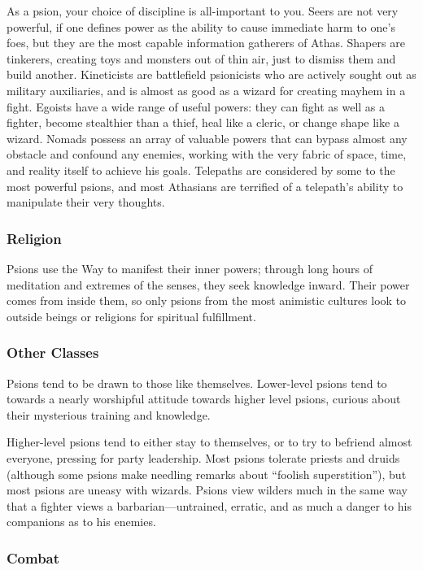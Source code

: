 As a psion, your choice of discipline is all-important to you. Seers are not very powerful, if one defines power as the ability to cause immediate harm to one's foes, but they are the most capable information gatherers of Athas. Shapers are tinkerers, creating toys and monsters out of thin air, just to dismiss them and build another. Kineticists are battlefield psionicists who are actively sought out as military auxiliaries, and is almost as good as a wizard for creating mayhem in a fight. Egoists have a wide range of useful powers: they can fight as well as a fighter, become stealthier than a thief, heal like a cleric, or change shape like a wizard. Nomads possess an array of valuable powers that can bypass almost any obstacle and confound any enemies, working with the very fabric of space, time, and reality itself to achieve his goals. Telepaths are considered by some to the most powerful psions, and most Athasians are terrified of a telepath's ability to manipulate their very thoughts.

\subsubsection{Religion}
Psions use the Way to manifest their inner powers; through long hours of meditation and extremes of the senses, they seek knowledge inward. Their power comes from inside them, so only psions from the most animistic cultures look to outside beings or religions for spiritual fulfillment.

\subsubsection{Other Classes}
Psions tend to be drawn to those like themselves. Lower-level psions tend to towards a nearly worshipful attitude towards higher level psions, curious about their mysterious training and knowledge.

Higher-level psions tend to either stay to themselves, or to try to befriend almost everyone, pressing for party leadership. Most psions tolerate priests and druids (although some psions make needling remarks about ``foolish superstition''), but most psions are uneasy with wizards. Psions view wilders much in the same way that a fighter views a barbarian---untrained, erratic, and as much a danger to his companions as to his enemies.

\subsubsection{Combat}

